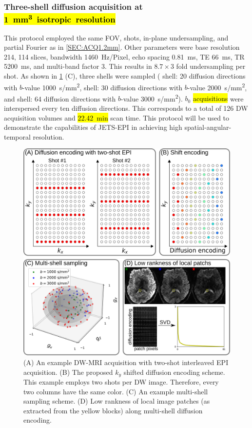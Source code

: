 \documentclass[preprint,12pt,authoryear,review]{elsarticle}
\begin{document}
    \subsubsection{Three-shell diffusion acquisition at \hl{\mbox{\SI{1}{\cubic\milli\meter} isotropic resolution}}}
    \label{SEC:ACQ1.0mm}
    This protocol employed the same FOV, shots,
    in-plane undersampling, and partial Fourier as in \cref{SEC:ACQ1.2mm}.
    Other parameters were base resolution 214, 114 slices, bandwidth \SI{1460}{Hz/Pixel},
    echo spacing \SI{0.81}{\milli\second}, TE \SI{66}{\milli\second}, TR \SI{5200}{ms},
    and multi-band factor $3$. This results in $8.7 \times 3$ fold undersampling per shot.
    As shown in \cref{FIG:sampling} (C), three shells were sampled
    ( shell: 20 diffusion directions with $b$-value \SI{1000}{s/mm^2},
     shell: 30 diffusion directions with $b$-value \SI{2000}{s/mm^2}, and
     shell: 64 diffusion directions with $b$-value \SI{3000}{s/mm^2}).
    $b_0$ \hl{acquisitions} were interspersed every ten diffusion directions.
    This corresponds to a total of 126 DW acquisition volumes and
    \hl{\mbox{\SI{22.42}{\minute}}} scan time.
    This protocol will be used to demonstrate the capabilities of JETS-EPI in achieving high
    spatial-angular-temporal resolution.

    \begin{figure}
        \centering
        \includegraphics[width=\linewidth]{../figures/fig1.png}
        \caption{(A) An example DW-MRI acquisition
        with two-shot interleaved EPI acquisition.
        (B) The proposed $k_y$ shifted diffusion encoding scheme.
        This example employs two shots per DW image.
        Therefore, every two columns have the same color.
        (C) An example multi-shell sampling scheme.
        (D) Low rankness of local image patches (as extracted from the yellow blocks)
        along multi-shell diffusion encoding.}
        \label{FIG:sampling}
    \end{figure}
\end{document}
